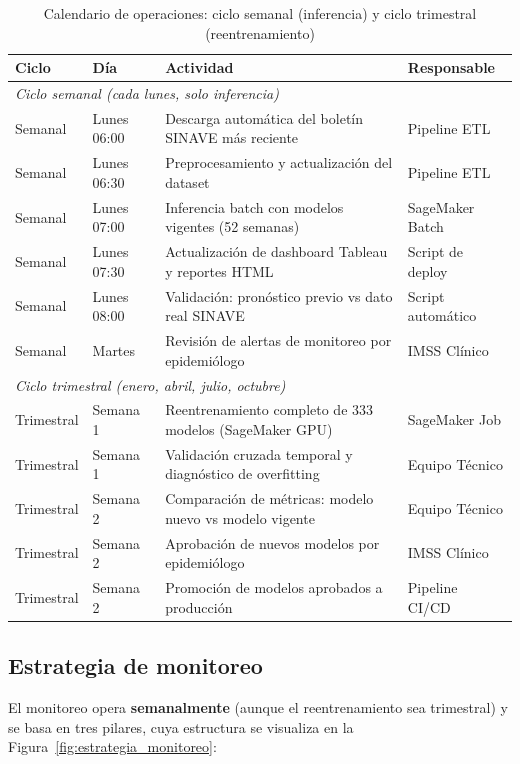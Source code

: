 \documentclass[12pt, letterpaper]{article}
\newcommand{\figref}[1]{Figura~\ref{#1}}
\begin{document}
\begin{table}[H]
\centering
\caption{Calendario de operaciones: ciclo semanal (inferencia) y ciclo trimestral (reentrenamiento)}
\label{tab:calendario}
\small
\begin{tabularx}{\textwidth}{l l X l}
\toprule
\textbf{Ciclo} & \textbf{Día} & \textbf{Actividad} & \textbf{Responsable} \\
\midrule
\multicolumn{4}{l}{\textit{Ciclo semanal (cada lunes, solo inferencia)}} \\
\midrule
Semanal & Lunes 06:00 & Descarga automática del boletín SINAVE más reciente & Pipeline ETL \\
Semanal & Lunes 06:30 & Preprocesamiento y actualización del dataset & Pipeline ETL \\
Semanal & Lunes 07:00 & Inferencia batch con modelos vigentes (52 semanas) & SageMaker Batch \\
Semanal & Lunes 07:30 & Actualización de dashboard Tableau y reportes HTML & Script de deploy \\
Semanal & Lunes 08:00 & Validación: pronóstico previo vs dato real SINAVE & Script automático \\
Semanal & Martes & Revisión de alertas de monitoreo por epidemiólogo & IMSS Clínico \\
\midrule
\multicolumn{4}{l}{\textit{Ciclo trimestral (enero, abril, julio, octubre)}} \\
\midrule
Trimestral & Semana 1 & Reentrenamiento completo de 333 modelos (SageMaker GPU) & SageMaker Job \\
Trimestral & Semana 1 & Validación cruzada temporal y diagnóstico de overfitting & Equipo Técnico \\
Trimestral & Semana 2 & Comparación de métricas: modelo nuevo vs modelo vigente & Equipo Técnico \\
Trimestral & Semana 2 & Aprobación de nuevos modelos por epidemiólogo & IMSS Clínico \\
Trimestral & Semana 2 & Promoción de modelos aprobados a producción & Pipeline CI/CD \\
\bottomrule
\end{tabularx}
\end{table}

\subsection{Estrategia de monitoreo}

El monitoreo opera \textbf{semanalmente} (aunque el reentrenamiento sea trimestral) y se basa en tres pilares, cuya estructura se visualiza en la \figref{fig:estrategia_monitoreo}:
\end{document}
